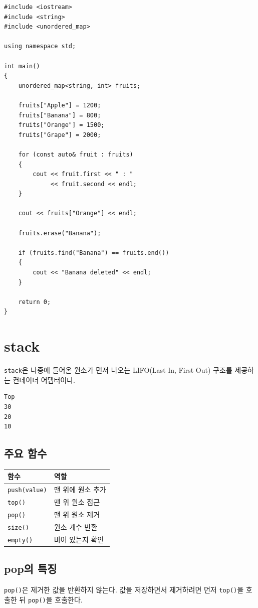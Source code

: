 \documentclass[11pt,a4paper]{article}
\begin{document}
\begin{lstlisting}
#include <iostream>
#include <string>
#include <unordered_map>

using namespace std;

int main()
{
    unordered_map<string, int> fruits;

    fruits["Apple"] = 1200;
    fruits["Banana"] = 800;
    fruits["Orange"] = 1500;
    fruits["Grape"] = 2000;

    for (const auto& fruit : fruits)
    {
        cout << fruit.first << " : "
             << fruit.second << endl;
    }

    cout << fruits["Orange"] << endl;

    fruits.erase("Banana");

    if (fruits.find("Banana") == fruits.end())
    {
        cout << "Banana deleted" << endl;
    }

    return 0;
}
\end{lstlisting}

\section{stack}
\texttt{stack}은 나중에 들어온 원소가 먼저 나오는 LIFO(Last In, First Out) 구조를 제공하는 컨테이너 어댑터이다.

\begin{verbatim}
Top
30
20
10
\end{verbatim}

\subsection{주요 함수}
\begin{center}
\begin{tabular}{ll}
\toprule
함수 & 역할 \\
\midrule
\texttt{push(value)} & 맨 위에 원소 추가 \\
\texttt{top()} & 맨 위 원소 접근 \\
\texttt{pop()} & 맨 위 원소 제거 \\
\texttt{size()} & 원소 개수 반환 \\
\texttt{empty()} & 비어 있는지 확인 \\
\bottomrule
\end{tabular}
\end{center}

\subsection{pop의 특징}
\texttt{pop()}은 제거한 값을 반환하지 않는다. 값을 저장하면서 제거하려면 먼저 \texttt{top()}을 호출한 뒤 \texttt{pop()}을 호출한다.
\end{document}
